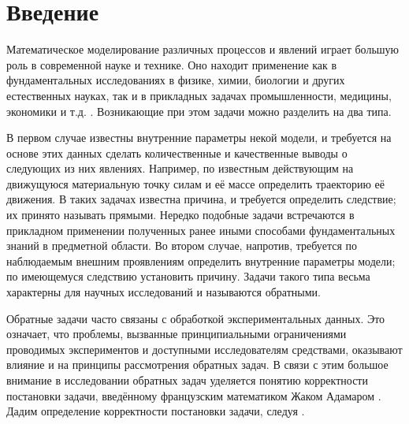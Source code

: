 \newpage
\section{Введение}

Математическое моделирование различных процессов и явлений играет большую роль в современной науке и технике. Оно находит применение как в фундаментальных исследованиях в физике, химии, биологии и других естественных науках, так и в прикладных задачах промышленности, медицины, экономики и т.д. \cite{samarskiy_models}. Возникающие при этом задачи можно разделить на два типа.

В первом случае известны внутренние параметры некой модели, и требуется на основе этих данных сделать количественные и качественные выводы о следующих из них явлениях. Например, по известным действующим на движущуюся материальную точку силам и её массе определить траекторию её движения. В таких задачах известна причина, и требуется определить следствие; их принято называть прямыми. Нередко подобные задачи встречаются в прикладном применении полученных ранее иными способами фундаментальных знаний в предметной области. Во втором случае, напротив, требуется по наблюдаемым внешним проявлениям определить внутренние параметры модели; по имеющемуся следствию установить причину. Задачи такого типа весьма характерны для научных исследований и называются обратными.

Обратные задачи часто связаны с обработкой экспериментальных данных. Это означает, что проблемы, вызванные принципиальными ограничениями проводимых экспериментов и доступными исследователям средствами, оказывают влияние и на принципы рассмотрения обратных задач. В связи с этим большое внимание в исследовании обратных задач уделяется понятию корректности постановки задачи, введённому французским математиком Жаком Адамаром \cite{hadamard}. Дадим определение корректности постановки задачи, следуя \cite{arsenin}.

